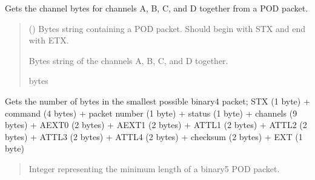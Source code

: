 \documentclass[letterpaper,10pt,english]{sphinxmanual}
\begin{document}
\begin{fulllineitems}
\begin{fulllineitems}
\label{\detokenize{PodApi.Packets:PodApi.Packets.Binary5.PacketBinary5.GetChannels}}
\pysigstartsignatures
{}
\pysigstopsignatures
\sphinxAtStartPar
Gets the channel bytes for channels A, B, C, and D together from a POD packet.
\begin{quote}\begin{description}
\sphinxAtStartPar
{} () \textendash{} Bytes string containing a POD packet. Should begin with STX and                 end with ETX.

\sphinxAtStartPar
Bytes string of the channels A, B, C, and D together.

\sphinxAtStartPar
bytes

\end{description}\end{quote}

\end{fulllineitems}


\begin{fulllineitems}
\label{\detokenize{PodApi.Packets:PodApi.Packets.Binary5.PacketBinary5.GetMinimumLength}}
\pysigstartsignatures
{}
\pysigstopsignatures
\sphinxAtStartPar
Gets the number of bytes in the smallest possible binary4 packet;         STX (1 byte) + command (4 bytes) + packet number (1 byte) + status (1 byte)         + channels (9 bytes) + AEXT0 (2 bytes) + AEXT1 (2 bytes) + ATTL1 (2 bytes)         + ATTL2 (2 bytes) + ATTL3 (2 bytes) + ATTL4 (2 bytes) + checksum (2 bytes)         + EXT (1 byte)
\begin{quote}\begin{description}
\sphinxAtStartPar
Integer representing the minimum length of a binary5 POD packet.


\end{description}
\end{quote}
\end{fulllineitems}
\end{fulllineitems}
\end{document}
